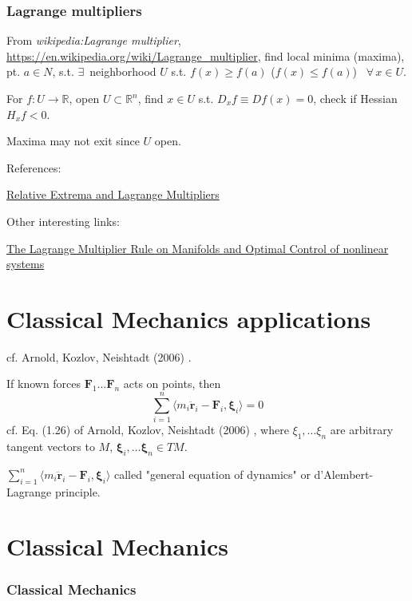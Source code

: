 \documentclass[10pt]{amsart}
\begin{document}
\begin{multicols*}{2}
\section{Lagrange multipliers}

From \emph{wikipedia:Lagrange multiplier}, \url{https://en.wikipedia.org/wiki/Lagrange_multiplier},
find local minima (maxima), pt. $a\in N$, s.t. $\exists \, $ neighborhood $U$ s.t. $f(x) \geq f(a)$ ($f(x) \leq f(a)$) \, $\forall \, x\in U$.

For $f:U\to \mathbb{R}$, open $U\subset \mathbb{R}^n$, find $x\in U$ s.t. $D_xf \equiv Df(x) =0$, check if Hessian $H_x f<0$.

Maxima may not exit since $U$ open.


References:

\href{http://www.math.uni.wroc.pl/~karch/analiza_nieliniowa/18_mnozniki-lagrangea.pdf}{Relative Extrema and Lagrange Multipliers}

Other interesting links:

\href{http://oai.cwi.nl/oai/asset/2552/2552A.pdf}{The Lagrange Multiplier Rule on Manifolds and Optimal Control of nonlinear systems}


\part{Classical Mechanics applications}

cf. Arnold, Kozlov, Neishtadt (2006) \cite{AKN2006}. 

If known forces $\mathbf{F}_1 \dots \mathbf{F}_n$ acts on points, then 
\begin{equation}
\sum_{i=1}^n \langle m_i \ddot{ \mathbf{r}}_i - \mathbf{F}_i , \mathbf{\xi}_i \rangle = 0
\end{equation}
cf. Eq. (1.26) of Arnold, Kozlov, Neishtadt (2006) \cite{AKN2006}, where $\xi_1 , \dots \xi_n$ are arbitrary tangent vectors to $M$, $\mathbf{\xi}_i, \dots \mathbf{\xi}_n \in TM$.  

$\sum_{i=1}^n \langle m_i \ddot{ \mathbf{r}}_i - \mathbf{F}_i , \mathbf{\xi}_i \rangle$ called "general equation of dynamics" or d'Alembert-Lagrange principle.  

\part{Classical Mechanics}

\section{Classical Mechanics}


\end{multicols*}
\end{document}
